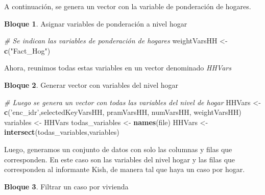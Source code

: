 \documentclass[]{book}
\newenvironment{Shaded}{\begin{snugshade}}{\end{snugshade}}
\newcommand{\CommentTok}[1]{\textcolor[rgb]{0.56,0.35,0.01}{\textit{#1}}}
\newcommand{\DecValTok}[1]{\textcolor[rgb]{0.00,0.00,0.81}{#1}}
\newcommand{\KeywordTok}[1]{\textcolor[rgb]{0.13,0.29,0.53}{\textbf{#1}}}
\newcommand{\NormalTok}[1]{#1}
\newcommand{\OperatorTok}[1]{\textcolor[rgb]{0.81,0.36,0.00}{\textbf{#1}}}
\newcommand{\StringTok}[1]{\textcolor[rgb]{0.31,0.60,0.02}{#1}}
\theoremstyle{definition}
\theoremstyle{definition}
\newtheorem{example}{Bloque}[chapter]
\theoremstyle{definition}
\theoremstyle{definition}
\theoremstyle{remark}
\begin{document}
A continuación, se genera un vector con la variable de ponderación de hogares.

\begin{example}
\protect\hypertarget{exm:bloque39nbm}{}{\label{exm:bloque39nbm} }Asignar variables de ponderación a nivel hogar
\end{example}

\begin{Shaded}
\begin{Highlighting}[]
\CommentTok{# Se indican las variables de ponderación de hogares}
\NormalTok{weightVarsHH <-}\StringTok{ }\KeywordTok{c}\NormalTok{(}\StringTok{"Fact_Hog"}\NormalTok{)}
\end{Highlighting}
\end{Shaded}

Ahora, reunimos todas estas variables en un vector denominado \emph{HHVars}

\begin{example}
\protect\hypertarget{exm:bloque40nbm}{}{\label{exm:bloque40nbm} }Generar vector con variables del nivel hogar
\end{example}

\begin{Shaded}
\begin{Highlighting}[]
\CommentTok{# Luego se genera un vector con todas las variables del nivel de hogar}
\NormalTok{HHVars <-}\StringTok{ }\KeywordTok{c}\NormalTok{(}\StringTok{'enc_idr'}\NormalTok{,selectedKeyVarsHH, pramVarsHH, numVarsHH, weightVarsHH)}
\NormalTok{variables <-}\StringTok{ }\NormalTok{HHVars}
\NormalTok{todas_variables <-}\StringTok{ }\KeywordTok{names}\NormalTok{(file)}
\NormalTok{HHVars <-}\StringTok{ }\KeywordTok{intersect}\NormalTok{(todas_variables,variables)}
\end{Highlighting}
\end{Shaded}

Luego, generamos un conjunto de datos con solo las columnas y filas que corresponden. En este caso son las variables del nivel hogar y las filas que corresponden al informante Kish, de manera tal que haya un caso por hogar.

\begin{example}
\protect\hypertarget{exm:bloque41nbm}{}{\label{exm:bloque41nbm} }Filtrar un caso por vivienda
\end{example}

\begin{Shaded}
\end{Shaded}
\end{document}
